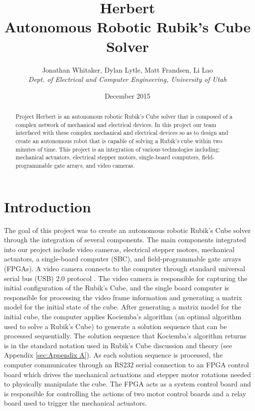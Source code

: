 \documentclass[final, letterpaper, 10 pt, conference, twocolumn]{IEEEtran}
\title{Herbert\\Autonomous Robotic Rubik's Cube Solver}
\author{
    Jonathan Whitaker, Dylan Lytle, Matt Frandsen, Li Lao\\
    \textit{Dept. of Electrical and Computer Engineering, University of Utah}\\
}
\date{December 2015}
\begin{document}
\maketitle

\begin{abstract}
Project Herbert is an autonomous robotic Rubik's Cube solver that is composed of a complex network of mechanical and electrical devices. In this project our team interfaced with these complex mechanical and electrical devices so as to design and create an autonomous robot that is capable of solving a Rubik's cube within two minutes of time.  This project is an integration of various technologies including: mechanical actuators, electrical stepper motors, single-board computers, field-programmable gate arrays, and video cameras.
\end{abstract}

\section{Introduction}
\label{sec:intro}
The goal of this project was to create an autonomous robotic Rubik's Cube solver through the integration of several components. The main components integrated into our project include video cameras, electrical stepper motors, mechanical actuators, a single-board computer (SBC), and field-programmable gate arrays (FPGAs). A video camera connects to the computer through standard universal serial bus (USB) 2.0 protocol \cite{USB2.0}. The video camera is responsible for capturing the initial configuration of the Rubik's Cube, and the single board computer is responsible for processing the video frame information and generating a matrix model for the initial state of the cube. After generating a matrix model for the initial cube, the computer applies Kociemba's algorithm \cite{Kociemba} (an optimal algorithm used to solve a Rubik's Cube) to generate a solution sequence that can be processed sequentially. The solution sequence that Kociemba's algorithm returns is in the standard notation used in Rubik's Cube discussion and theory (see Appendix \ref{sec:Appendix A}). As each solution sequence is processed, the computer communicates through an RS232 serial connection to an FPGA control board which drives the mechanical actuations and stepper motor rotations needed to physically manipulate the cube. The FPGA acts as a system control board and is responsible for controlling the actions of two motor control boards and a relay board used to trigger the mechanical actuators.
\end{document}
